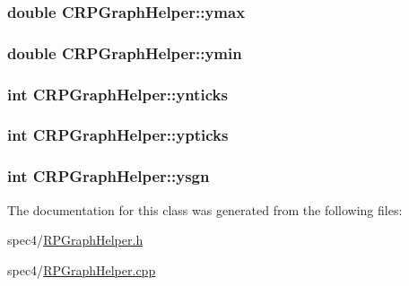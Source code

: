\label{classCRPGraphHelper_aee9dc64ed4b8c8dd52d0da8038776f0f}
\hypertarget{classCRPGraphHelper_acc153e73a250d824d7be26eb8596fbe0}{
\subsubsection[{ymax}]{\setlength{\rightskip}{0pt plus 5cm}double {\bf CRPGraphHelper::ymax}}}
\label{classCRPGraphHelper_acc153e73a250d824d7be26eb8596fbe0}
\hypertarget{classCRPGraphHelper_a6abfda58e3ec46c62d4416116519a529}{
\subsubsection[{ymin}]{\setlength{\rightskip}{0pt plus 5cm}double {\bf CRPGraphHelper::ymin}}}
\label{classCRPGraphHelper_a6abfda58e3ec46c62d4416116519a529}
\hypertarget{classCRPGraphHelper_a5b43e306f051fc2fede38601a6d37537}{
\subsubsection[{ynticks}]{\setlength{\rightskip}{0pt plus 5cm}int {\bf CRPGraphHelper::ynticks}}}
\label{classCRPGraphHelper_a5b43e306f051fc2fede38601a6d37537}
\hypertarget{classCRPGraphHelper_a5380625f364db80d0c2830b571e9e129}{
\subsubsection[{ypticks}]{\setlength{\rightskip}{0pt plus 5cm}int {\bf CRPGraphHelper::ypticks}}}
\label{classCRPGraphHelper_a5380625f364db80d0c2830b571e9e129}
\hypertarget{classCRPGraphHelper_ad4a4ac06bfada99008104d9260605e55}{
\subsubsection[{ysgn}]{\setlength{\rightskip}{0pt plus 5cm}int {\bf CRPGraphHelper::ysgn}}}
\label{classCRPGraphHelper_ad4a4ac06bfada99008104d9260605e55}


The documentation for this class was generated from the following files:\begin{DoxyCompactItemize}
\item 
spec4/\hyperlink{RPGraphHelper_8h}{RPGraphHelper.h}\item 
spec4/\hyperlink{RPGraphHelper_8cpp}{RPGraphHelper.cpp}\end{DoxyCompactItemize}

